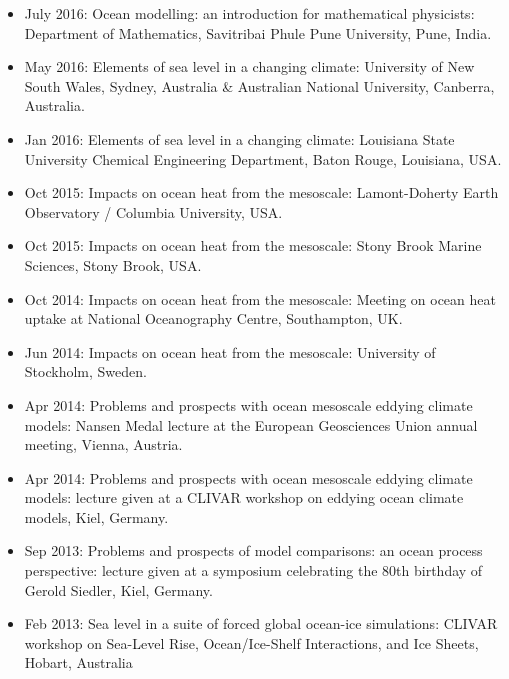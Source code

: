 \documentclass{article}
\begin{document}
\begin{itemize}[leftmargin=*]
\item July 2016: {\sc Ocean modelling: an introduction for
    mathematical physicists}: Department of Mathematics, Savitribai
  Phule Pune University, Pune, India.

\item May 2016: {\sc Elements of sea level in a changing climate}:
  University of New South Wales, Sydney, Australia \& Australian
  National University, Canberra, Australia.

\item Jan 2016: {\sc Elements of sea level in a changing climate}:
  Louisiana State University Chemical Engineering Department, Baton
  Rouge, Louisiana, USA.

\item Oct 2015: {\sc Impacts on ocean heat from the mesoscale}:
  Lamont-Doherty Earth Observatory / Columbia University, USA.

\item Oct 2015: {\sc Impacts on ocean heat from the mesoscale}: Stony
  Brook Marine Sciences, Stony Brook, USA.

\item Oct 2014: {\sc Impacts on ocean heat from the mesoscale}:
  Meeting on ocean heat uptake at National Oceanography Centre,
  Southampton, UK.

\item Jun 2014: {\sc Impacts on ocean heat from the mesoscale}:
  University of Stockholm, Sweden.

\item Apr 2014: {\sc Problems and prospects with ocean mesoscale
    eddying climate models}: Nansen Medal lecture at the European
  Geosciences Union annual meeting, Vienna, Austria.

\item Apr 2014: {\sc Problems and prospects with ocean mesoscale
    eddying climate models}: lecture given at a CLIVAR workshop on
  eddying ocean climate models, Kiel, Germany.

\item Sep 2013: {\sc Problems and prospects of model comparisons: an
    ocean process perspective}: lecture given at a symposium
  celebrating the 80th birthday of Gerold Siedler, Kiel, Germany.

\item Feb 2013: {\sc Sea level in a suite of forced global ocean-ice
    simulations}: CLIVAR workshop on Sea-Level Rise, Ocean/Ice-Shelf
  Interactions, and Ice Sheets, Hobart, Australia


\end{itemize}
\end{document}
